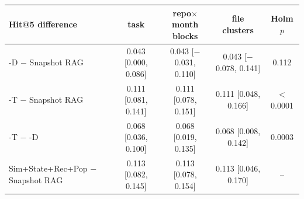 \begin{tabular}{lcccc}
\toprule
Hit@5 difference & task & repo$\times$month blocks & file clusters & Holm $p$ \\
\midrule
\sys{}-D $-$ Snapshot RAG & 0.043 [0.000, 0.086] & 0.043 [$-$0.031, 0.110] & 0.043 [$-$0.078, 0.141] & 0.112 \\
\sys{}-T $-$ Snapshot RAG & 0.111 [0.081, 0.141] & 0.111 [0.078, 0.151] & 0.111 [0.048, 0.166] & $<$0.0001 \\
\sys{}-T $-$ \sys{}-D & 0.068 [0.036, 0.100] & 0.068 [0.019, 0.135] & 0.068 [0.008, 0.142] & 0.0003 \\
Sim+State+Rec+Pop $-$ Snapshot RAG & 0.113 [0.082, 0.145] & 0.113 [0.078, 0.154] & 0.113 [0.046, 0.170] & -- \\
\bottomrule
\end{tabular}
